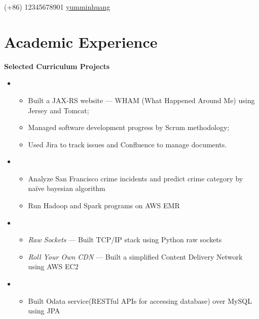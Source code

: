 \documentclass{resume}
\begin{document}


{(+86) 12345678901}
{\href{https://github.com/yumminhuang}{yumminhuang}}

%
%

\section{Academic Experience}

\textbf{Selected Curriculum Projects}
\begin{itemize}
\item {}
\begin{itemize}
\item Built a JAX-RS website --- WHAM (What Happened Around Me) using Jersey and Tomcat;
\item Managed software development progress by Scrum methodology;
\item Used Jira to track issues and Confluence to manage documents.
\end{itemize}

\item {}
\begin{itemize}
\item Analyze San Francisco crime incidents and predict crime category by na\"{i}ve bayesian algorithm
\item Run Hadoop and Spark programs on AWS EMR
\end{itemize}

\item {}
\begin{itemize}
\item \textit{Raw Sockets} --- Built TCP/IP stack using Python raw sockets
\item \textit{Roll Your Own CDN} --- Built a simplified Content Delivery Network using AWS EC2
\end{itemize}

\item {}
\begin{itemize}
\item Built Odata service(RESTful APIs for accessing database) over MySQL using JPA
\end{itemize}
\end{itemize}
\end{document}
